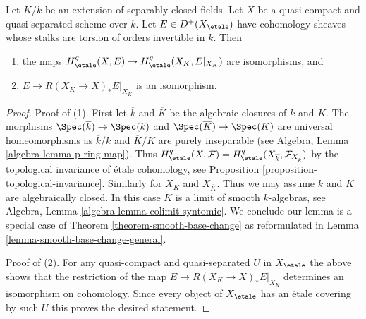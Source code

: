 \begin{lemma}
\label{lemma-smooth-base-change-separably-closed}
Let $K/k$ be an extension of separably closed fields. Let $X$
be a quasi-compact and quasi-separated scheme over $k$.
Let $E \in D^+(X_\etale)$ have cohomology sheaves whose stalks
are torsion of orders invertible in $k$. Then
\begin{enumerate}
\item the maps $H^q_\etale(X, E) \to H^q_\etale(X_K, E|_{X_K})$
are isomorphisms, and
\item $E \to R(X_K \to X)_*E|_{X_K}$ is an isomorphism.
\end{enumerate}
\end{lemma}

\begin{proof}
Proof of (1). First let $\overline{k}$ and $\overline{K}$
be the algebraic closures
of $k$ and $K$. The morphisms $\Spec(\overline{k}) \to \Spec(k)$ and
$\Spec(\overline{K}) \to \Spec(K)$ are universal homeomorphisms
as $\overline{k}/k$ and $\overline{K}/K$ are purely inseparable
(see Algebra, Lemma \ref{algebra-lemma-p-ring-map}).
Thus $H^q_\etale(X, \mathcal{F}) =
H^q_\etale(X_{\overline{k}}, \mathcal{F}_{X_{\overline{k}}})$ by
the topological invariance of \'etale cohomology, see
Proposition \ref{proposition-topological-invariance}.
Similarly for $X_K$ and $X_{\overline{K}}$.
Thus we may assume $k$ and $K$ are algebraically closed.
In this case $K$ is a limit of smooth $k$-algebras, see
Algebra, Lemma \ref{algebra-lemma-colimit-syntomic}.
We conclude our lemma is a special case of
Theorem \ref{theorem-smooth-base-change} as reformulated in
Lemma \ref{lemma-smooth-base-change-general}.

\medskip\noindent
Proof of (2). For any quasi-compact and quasi-separated $U$ in $X_\etale$
the above shows that the restriction of the map
$E \to R(X_K \to X)_*E|_{X_K}$ determines an isomorphism on cohomology.
Since every object of $X_\etale$ has an \'etale covering by such $U$
this proves the desired statement.
\end{proof}
